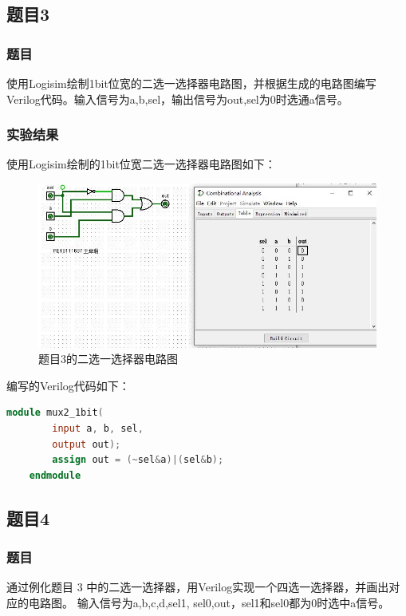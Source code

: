 \documentclass[UTF8]{article}
\begin{document}
	\subsection{题目3}
	\subsubsection{题目}
	使用Logisim绘制1bit位宽的二选一选择器电路图，并根据生成的电路图编写Verilog代码。输入信号为a,b,sel，输出信号为out,sel为0时选通a信号。\par
	\subsubsection{实验结果}
	使用Logisim绘制的1bit位宽二选一选择器电路图如下：\par
	\begin{figure}[h]
		\centering
		\includegraphics[scale=0.6]{Problem3_Curcuit.jpg}
		\caption{题目3的二选一选择器电路图}
		\label{Problem3_Curcuit}
	\end{figure}\par
	编写的Verilog代码如下：\par
	\begin{lstlisting}[language=Verilog]
	module mux2_1bit(
		input a, b, sel,
		output out);
		assign out = (~sel&a)|(sel&b);
	endmodule
	\end{lstlisting}\par

	\subsection{题目4}
	\subsubsection{题目}
	通过例化题目 3 中的二选一选择器，用Verilog实现一个四选一选择器，并画出对应的电路图。 输入信号为a,b,c,d,sel1, sel0,out，sel1和sel0都为0时选中a信号。\par
\end{document}
